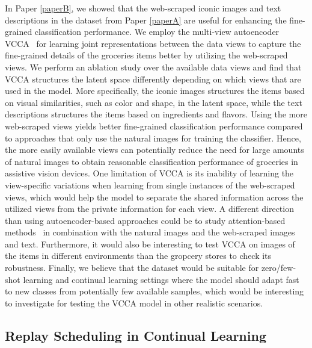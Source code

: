In Paper \ref{paperB}, we showed that the web-scraped iconic images and text descriptions in the dataset from Paper \ref{paperA} are useful for enhancing the fine-grained classification performance. We employ the multi-view autoencoder VCCA~\cite{wang2016deep} for learning joint representations between the data views to capture the fine-grained details of the groceries items better by utilizing the web-scraped views. We perform an ablation study over the available data views and find that VCCA structures the latent space differently depending on which views that are used in the model. More specifically, the iconic images structures the items based on visual similarities, such as color and shape, in the latent space, while the text descriptions structures the items based on ingredients and flavors. Using the more web-scraped views yields better fine-grained classification performance compared to approaches that only use the natural images for training the classifier. Hence, the more easily available views can potentially reduce the need for large amounts of natural images to obtain reasonable classification performance of groceries in assistive vision devices. One limitation of VCCA is its inability of learning the view-specific variations when learning from single instances of the web-scraped views, which would help the model to separate the shared information across the utilized views from the private information for each view. A different direction than using autoencoder-based approaches could be to study attention-based methods~\cite{fu2017look, zheng2019looking, luong2015effective} in combination with the natural images and the web-scraped images and text. Furthermore, it would also be interesting to test VCCA on images of the items in different environments than the gropcery stores to check its robustness. Finally, we believe that the dataset would be suitable for zero/few-shot learning and continual learning settings where the model should adapt fast to new classes from potentially few available samples, which would be interesting to investigate for testing the VCCA model in other realistic scenarios. 





\subsection{Replay Scheduling in Continual Learning}

